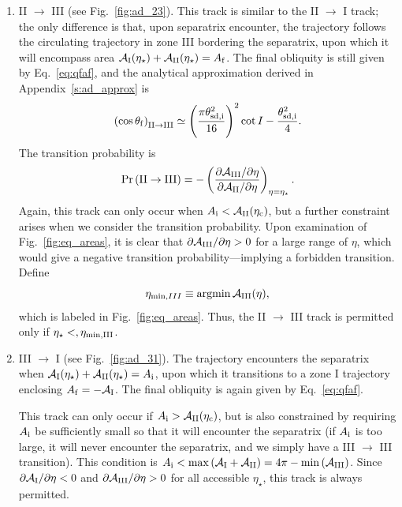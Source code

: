 \documentclass[twocolumn,twocolappendix]{aastex63}
\newcommand*{\pdil}[2]{\partial#1 / \partial#2}
\newcommand*{\p}[1]{\left(#1\right)}
\DeclareMathOperator*{\argmin}{argmin}
\begin{document}
\begin{enumerate}
    \item II $\to$ III (see Fig.~\ref{fig:ad_23}). This track is similar to the
        II $\to$ I track; the only difference is that, upon separatrix
        encounter, the trajectory follows the circulating trajectory in zone III
        bordering the separatrix, upon which it will encompass area
        $\mathcal{A}_{\rm I}(\eta_\star) + \mathcal{A}_{\rm II}(\eta_\star) =
        A_{\rm f}$. The final obliquity is still given by Eq.~\eqref{eq:qfaf},
        and the analytical approximation derived in Appendix~\ref{s:ad_approx}
        is
        \begin{equation}
            \p{\cos \theta_{\rm f}}_{\rm II \to III} \simeq
                \p{\frac{\pi \theta_{\rm sd, i}^2}{16}}^2 \cot I
                    - \frac{\theta_{\rm sd, i}^2}{4}.\label{eq:qf_23_approx}
        \end{equation}
        The transition probability is
        \begin{equation}
            \Pr\p{\mathrm{II} \to \mathrm{III}} = -\p{
                \frac{\pdil{\mathcal{A}_{\rm III}}{\eta}}{\pdil{\mathcal{A}_{\rm
                    II}}{\eta}}} _{\eta = \eta_{\star}}.
        \end{equation}
        Again, this track can only occur when $A_{\rm i} < \mathcal{A}_{\rm
        II}(\eta_{\rm c})$, but a further constraint arises when we consider the
        transition probability. Upon examination of Fig.~\ref{fig:eq_areas}, it
        is clear that $\pdil{\mathcal{A}_{\rm III}}{\eta} > 0$ for a large range
        of $\eta$, which would give a negative transition probability---implying
        a forbidden transition. Define
        \begin{equation}
            \eta_{\min, III} \equiv \argmin \mathcal{A}_{\rm III}(\eta)
                \label{eq:eta_minIII},
        \end{equation}
        which is labeled in Fig.~\ref{fig:eq_areas}. Thus, the II $\to$ III
        track is permitted only if $\eta_\star <, \eta_{\rm \min, III}$.

    \item III $\to$ I (see Fig.~\ref{fig:ad_31}). The trajectory encounters the
        separatrix when $\mathcal{A}_{\rm I}(\eta_\star) + \mathcal{A}_{\rm
        II}(\eta_\star) = A_{\rm i}$, upon which it transitions to a zone I
        trajectory enclosing $A_{\rm f} = -\mathcal{A}_{\rm I}$. The final
        obliquity is again given by Eq.~\eqref{eq:qfaf}.

        This track can only occur if $A_{\rm i} > \mathcal{A}_{\rm II}(\eta_{\rm
        c})$, but is also constrained by requiring $A_{\rm i}$ be sufficiently
        small so that it will encounter the separatrix (if $A_{\rm i}$ is too
        large, it will never encounter the separatrix, and we simply have a III
        $\to$ III transition). This condition is $A_{\rm i} < \max
        \p{\mathcal{A}_{\rm I} + \mathcal{A}_{\rm II}} = 4\pi - \min
        \p{\mathcal{A}_{\rm III}}$. Since $\pdil{\mathcal{A}_{\rm I}}{\eta} < 0$
        and $\pdil{\mathcal{A}_{\rm III}}{\eta} > 0$ for all accessible
        $\eta_{\star}$, this track is always permitted.


\end{enumerate}
\end{document}
